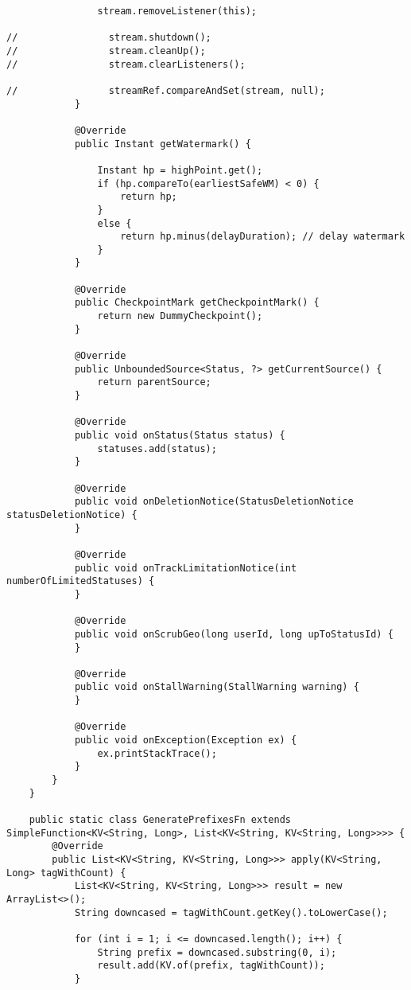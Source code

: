 \begin{codelisting}
\begin{verbatim}
                stream.removeListener(this);

//                stream.shutdown();
//                stream.cleanUp();
//                stream.clearListeners();

//                streamRef.compareAndSet(stream, null);
            }

            @Override
            public Instant getWatermark() {

                Instant hp = highPoint.get();
                if (hp.compareTo(earliestSafeWM) < 0) {
                    return hp;
                }
                else {
                    return hp.minus(delayDuration); // delay watermark
                }
            }

            @Override
            public CheckpointMark getCheckpointMark() {
                return new DummyCheckpoint();
            }

            @Override
            public UnboundedSource<Status, ?> getCurrentSource() {
                return parentSource;
            }

            @Override
            public void onStatus(Status status) {
                statuses.add(status);
            }

            @Override
            public void onDeletionNotice(StatusDeletionNotice statusDeletionNotice) {
            }

            @Override
            public void onTrackLimitationNotice(int numberOfLimitedStatuses) {
            }

            @Override
            public void onScrubGeo(long userId, long upToStatusId) {
            }

            @Override
            public void onStallWarning(StallWarning warning) {
            }

            @Override
            public void onException(Exception ex) {
                ex.printStackTrace();
            }
        }
    }

    public static class GeneratePrefixesFn extends SimpleFunction<KV<String, Long>, List<KV<String, KV<String, Long>>>> {
        @Override
        public List<KV<String, KV<String, Long>>> apply(KV<String, Long> tagWithCount) {
            List<KV<String, KV<String, Long>>> result = new ArrayList<>();
            String downcased = tagWithCount.getKey().toLowerCase();

            for (int i = 1; i <= downcased.length(); i++) {
                String prefix = downcased.substring(0, i);
                result.add(KV.of(prefix, tagWithCount));
            }


\end{verbatim}
\end{codelisting}
